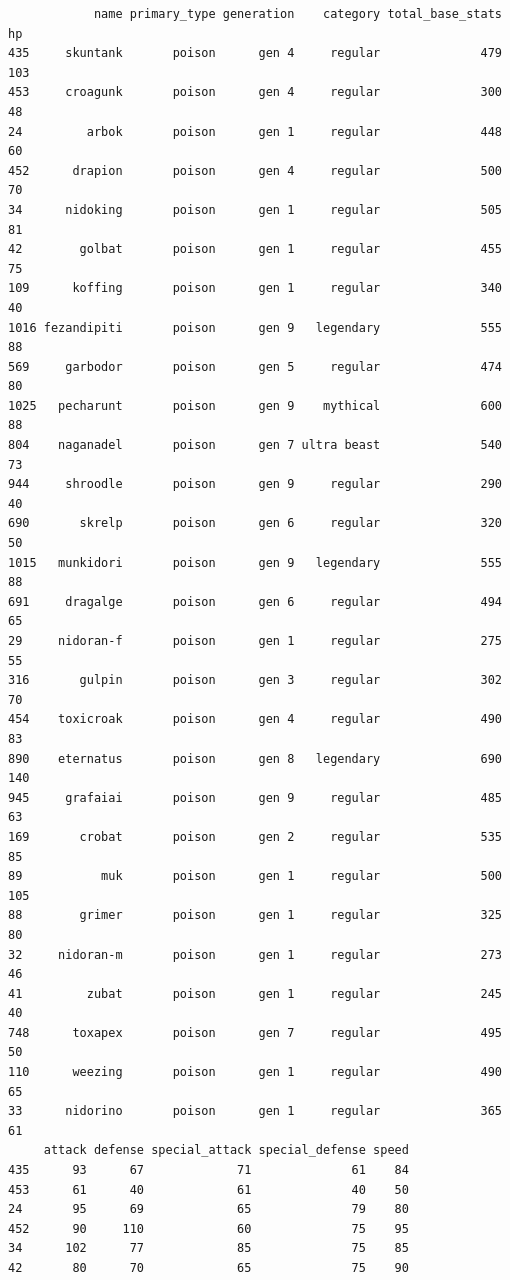 \documentclass[
  12pt,
]{extreport}
\begin{document}
\begin{itemize}
\begin{verbatim}
            name primary_type generation    category total_base_stats  hp
435     skuntank       poison      gen 4     regular              479 103
453     croagunk       poison      gen 4     regular              300  48
24         arbok       poison      gen 1     regular              448  60
452      drapion       poison      gen 4     regular              500  70
34      nidoking       poison      gen 1     regular              505  81
42        golbat       poison      gen 1     regular              455  75
109      koffing       poison      gen 1     regular              340  40
1016 fezandipiti       poison      gen 9   legendary              555  88
569     garbodor       poison      gen 5     regular              474  80
1025   pecharunt       poison      gen 9    mythical              600  88
804    naganadel       poison      gen 7 ultra beast              540  73
944     shroodle       poison      gen 9     regular              290  40
690       skrelp       poison      gen 6     regular              320  50
1015   munkidori       poison      gen 9   legendary              555  88
691     dragalge       poison      gen 6     regular              494  65
29     nidoran-f       poison      gen 1     regular              275  55
316       gulpin       poison      gen 3     regular              302  70
454    toxicroak       poison      gen 4     regular              490  83
890    eternatus       poison      gen 8   legendary              690 140
945     grafaiai       poison      gen 9     regular              485  63
169       crobat       poison      gen 2     regular              535  85
89           muk       poison      gen 1     regular              500 105
88        grimer       poison      gen 1     regular              325  80
32     nidoran-m       poison      gen 1     regular              273  46
41         zubat       poison      gen 1     regular              245  40
748      toxapex       poison      gen 7     regular              495  50
110      weezing       poison      gen 1     regular              490  65
33      nidorino       poison      gen 1     regular              365  61
     attack defense special_attack special_defense speed
435      93      67             71              61    84
453      61      40             61              40    50
24       95      69             65              79    80
452      90     110             60              75    95
34      102      77             85              75    85
42       80      70             65              75    90

\end{verbatim}
\end{itemize}
\end{document}
